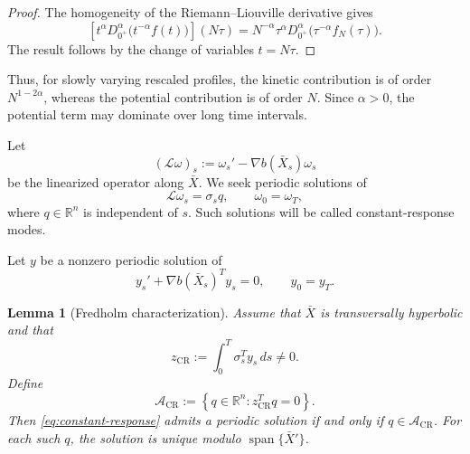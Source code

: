 \documentclass[preprint,12pt]{elsarticle}
\newtheorem{lemma}[theorem]{Lemma}
\theoremstyle{definition}
\theoremstyle{plain}
\begin{document}
\begin{proof}
The homogeneity of the Riemann--Liouville derivative gives
\begin{equation*}
\left[
    t^\alpha D_{0^+}^\alpha
    \bigl(t^{-\alpha}f(t)\bigr)
\right](N\tau)
=
N^{-\alpha}
\tau^\alpha D_{0^+}^\alpha
\bigl(\tau^{-\alpha}f_N(\tau)\bigr).
\end{equation*}
The result follows by the change of variables $t=N\tau$.
\end{proof}

Thus, for slowly varying rescaled profiles, the kinetic contribution
is of order $N^{1-2\alpha}$, whereas the potential contribution is of
order $N$. Since $\alpha>0$, the potential term may dominate over long
time intervals.

Let
\begin{equation*}
    (\mathcal L\omega)_s
    :=
    \omega_s'
    -
    \nabla b(\bar X_s)\omega_s
\end{equation*}
be the linearized operator along $\bar X$. We seek periodic solutions
of
\begin{equation}
\label{eq:constant-response}
    \mathcal L\omega_s=\sigma_s q,
    \qquad
    \omega_0=\omega_T,
\end{equation}
where $q\in\mathbb R^n$ is independent of $s$. Such solutions will be
called constant-response modes.

Let $y$ be a nonzero periodic solution of
\begin{equation}
\label{eq:left-zero-mode}
    y_s'
    +
    \nabla b(\bar X_s)^Ty_s
    =
    0,
    \qquad
    y_0=y_T.
\end{equation}

\begin{lemma}[Fredholm characterization]
\label{lem:constant-response-fredholm}
Assume that $\bar X$ is transversally hyperbolic and that
\begin{equation}
\label{eq:zcr-nondegenerate}
    z_{\mathrm{CR}}
    :=
    \int_0^T\sigma_s^Ty_s\,ds
    \neq0.
\end{equation}
Define
\begin{equation}
\label{eq:ACR-def}
    \mathcal A_{\mathrm{CR}}
    :=
    \left\{
        q\in\mathbb R^n:
        z_{\mathrm{CR}}^Tq=0
    \right\}.
\end{equation}
Then \eqref{eq:constant-response} admits a periodic solution if and
only if $q\in\mathcal A_{\mathrm{CR}}$. For each such $q$, the solution
is unique modulo $\operatorname{span}\{\bar X'\}$.
\end{lemma}
\end{document}

